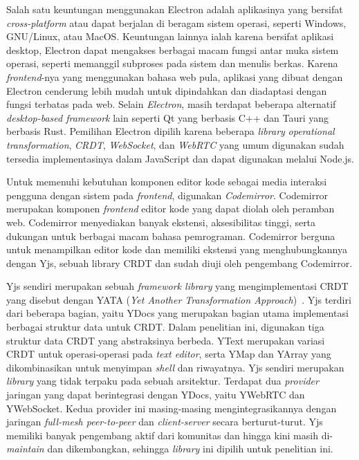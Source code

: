 Salah satu keuntungan menggunakan Electron adalah aplikasinya yang bersifat \textit{cross-platform} atau dapat berjalan di beragam sistem operasi, seperti Windows, GNU/Linux, atau MacOS. Keuntungan lainnya ialah karena bersifat aplikasi desktop, Electron dapat mengakses berbagai macam fungsi antar muka sistem operasi, seperti memanggil subproses pada sistem dan menulis berkas. Karena \textit{frontend}-nya yang menggunakan bahasa web pula, aplikasi yang dibuat dengan Electron cenderung lebih mudah untuk dipindahkan dan diadaptasi dengan fungsi terbatas pada web. Selain \textit{Electron}, masih terdapat beberapa alternatif \textit{desktop-based framework} lain seperti Qt yang berbasis C++ dan Tauri yang berbasis Rust. Pemilihan Electron dipilih karena beberapa \textit{library} \textit{operational transformation}, \textit{CRDT}, \textit{WebSocket}, dan \textit{WebRTC} yang umum digunakan sudah tersedia implementasinya dalam JavaScript dan dapat digunakan melalui Node.js.

Untuk memenuhi kebutuhan komponen editor kode sebagai media interaksi pengguna dengan sistem pada \textit{frontend}, digunakan \textit{Codemirror}. Codemirror merupakan komponen \textit{frontend} editor kode yang dapat diolah oleh peramban web. Codemirror menyediakan banyak ekstensi, aksesibilitas tinggi, serta dukungan untuk berbagai macam bahasa pemrograman. Codemirror berguna untuk menampilkan editor kode dan memiliki ekstensi yang menghubungkannya dengan Yjs, sebuah library CRDT dan sudah diuji oleh pengembang Codemirror.

Yjs sendiri merupakan sebuah \textit{framework library} yang mengimplementasi CRDT yang disebut dengan YATA (\textit{Yet Another Transformation Approach})~\citep{Nicolaescu2016yjs}. Yjs terdiri dari beberapa bagian, yaitu YDocs yang merupakan bagian utama implementasi berbagai struktur data untuk CRDT. Dalam penelitian ini, digunakan tiga struktur data CRDT yang abstraksinya berbeda. YText merupakan variasi CRDT untuk operasi-operasi pada \textit{text editor}, serta YMap dan YArray yang dikombinasikan untuk menyimpan \textit{shell} dan riwayatnya. Yjs sendiri merupakan \textit{library} yang tidak terpaku pada sebuah arsitektur. Terdapat dua \textit{provider} jaringan yang dapat berintegrasi dengan YDocs, yaitu YWebRTC dan YWebSocket. Kedua provider ini masing-masing mengintegrasikannya dengan jaringan \textit{full-mesh peer-to-peer} dan \textit{client-server} secara berturut-turut. Yjs memiliki banyak pengembang aktif dari komunitas dan hingga kini masih di-\textit{maintain} dan dikembangkan, sehingga \textit{library} ini dipilih untuk penelitian ini.

